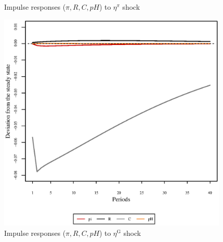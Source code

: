 \begin{figure}[h]
\begin{minipage}{0.5\textwidth}
\caption{Impulse responses ($\pi, R, C, {p\!H}$) to $\eta^{\pi}$ shock}
\end{minipage}
\end{figure}

\pagebreak

\begin{figure}[h]
\centering
\begin{minipage}{0.5\textwidth}
\vspace*{-3em}
\centering
\includegraphics[width=0.99\textwidth, scale=0.55]{plots/plot_35.eps}
\caption{Impulse responses ($\pi, R, C, {p\!H}$) to $\eta^{\mathrm{G}}$ shock}
\end{minipage}
\end{figure}
